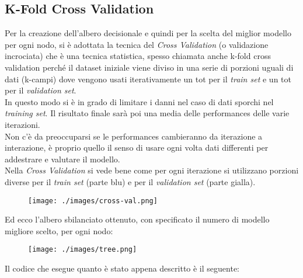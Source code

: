 \subsection{K-Fold Cross Validation}
Per la creazione dell'albero decisionale e quindi per la scelta del miglior modello per ogni nodo, si è adottata la tecnica del \textit{Cross Validation} (o validazione incrociata) che è una tecnica statistica, spesso chiamata anche k-fold cross validation perché il dataset iniziale viene diviso in una serie di porzioni uguali di dati (k-campi) dove vengono usati iterativamente un tot per il \textit{train set} e un tot per il \textit{validation set}.\\
\newline In questo modo si è in grado di limitare i danni nel caso di dati sporchi nel \textit{training set}. Il risultato finale sarà poi una media delle performances delle varie iterazioni.\\ Non c’è da preoccuparsi se le performances cambieranno da iterazione a interazione, è proprio quello il senso di usare ogni volta dati differenti per addestrare e valutare il modello.\\
\newline Nella \textit{Cross Validation} si vede bene come per ogni iterazione si utilizzano porzioni diverse per il \textit{train set} (parte blu) e per il \textit{validation set} (parte gialla).
\begin{figure}[H]
	\centering
	\texttt{[image: ./images/cross-val.png]}
\end{figure}
\noindent Ed ecco l'albero sbilanciato ottenuto, con specificato il numero di modello migliore scelto, per ogni nodo:
\begin{figure}[H]
	\centering
	\texttt{[image: ./images/tree.png]}
\end{figure}
\noindent Il codice che esegue quanto è stato appena descritto è il seguente:
\vspace*{2ex}
\vspace*{2ex}